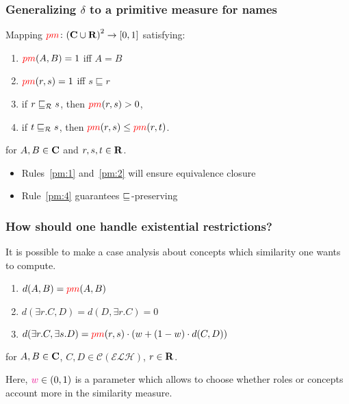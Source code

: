 \documentclass{beamer}
\begin{document}
\begin{frame}
  \frametitle{Generalizing \(\delta{}\) to a primitive measure for names}
  \begin{definition}
    Mapping \(\textcolor{red}{pm} \colon {(\mathbf{C}\cup \mathbf{R})}^2 \to [0,1]\)
    satisfying:
    \begin{enumerate}[<+->]
      \item\label{pm:1} \(\textcolor{red}{pm}(A,B) = 1\) iff \(A = B\)
      \item\label{pm:2} \(\textcolor{red}{pm}(r,s) = 1\) iff \(s \sqsubseteq r\)
      \item\label{pm:3} if \(r \sqsubseteq_{\mathcal{R}} s\), then \(\textcolor{red}{pm}(r,s) > 0\),
      \item\label{pm:4} if \(t \sqsubseteq_{\mathcal{R}} s\), then \(\textcolor{red}{pm}(r,s) \le \textcolor{red}{pm}(r,t)\).
    \end{enumerate}
    for \(A,B \in \mathbf{C}\) and \(r,s,t \in \mathbf{R}\).
  \end{definition}
  \begin{itemize}[<+->]
    \item Rules~\ref{pm:1} and~\ref{pm:2} will 
    ensure equivalence closure
    \item Rule~\ref{pm:4} guarantees
    \(\sqsubseteq_{\mathcal{}}\)-preserving
  \end{itemize}
\end{frame}

\begin{frame}
  \frametitle{How should one handle existential restrictions?}
  It is possible to make a case analysis about
  concepts which similarity one wants to compute.
  \begin{enumerate}[<+->]
    \item \(d(A,B) = \textcolor{red}{pm}(A,B)\)
    \item \(d(\exists{}r.C,D) = d(D,\exists{}r.C) = 0\)
    \item \(d(\exists{}r.C,\exists{}s.D) =
    \textcolor{red}{pm}(r,s) \cdot \left(w + (1-w) \cdot d(C,D)\right)\)
  \end{enumerate}
  for \(A,B \in \mathbf{C}\),
  \(C,D \in \mathcal{C}(\mathcal{ELH})\),
  \(r \in \mathbf{R}\).

  Here, \(\textcolor{magenta}{w} \in (0,1)\) is a parameter which allows
  to choose whether roles or concepts account more
  in the similarity measure.
\end{frame}
\end{document}
